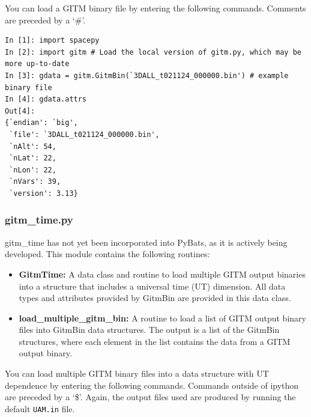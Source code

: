 You can load a GITM binary file by entering the following commands.  Comments are preceded by a `\#'.

\begin{verbatim}
In [1]: import spacepy
In [2]: import gitm # Load the local version of gitm.py, which may be more up-to-date
In [3]: gdata = gitm.GitmBin(`3DALL_t021124_000000.bin') # example binary file
In [4]: gdata.attrs
Out[4]:
{`endian': `big',
 `file': `3DALL_t021124_000000.bin',
 `nAlt': 54,
 `nLat': 22,
 `nLon': 22,
 `nVars': 39,
 `version': 3.13}
\end{verbatim}

\subsubsection{gitm\_time.py}

gitm\_time has not yet been incorporated into PyBats, as it is actively being developed.   This module contains the following routines:

\begin{itemize}
\item[]{\bf GitmTime: } A data class and routine to load multiple GITM output binaries into a structure that includes a universal time (UT) dimension.  All data types and attributes provided by GitmBin are provided in this data class.
\item[]{\bf load\_multiple\_gitm\_bin: } A routine to load a list of GITM output binary files into GitmBin data structures.  The output is a list of the GitmBin structures, where each element in the list contains the data from a GITM output binary.
\end{itemize}

You can load multiple GITM binary files into a data structure with UT dependence by entering the following commands.  Commands outside of ipython are preceded by a `\$'.  Again, the output files used are produced by running the default {\tt UAM.in} file.

